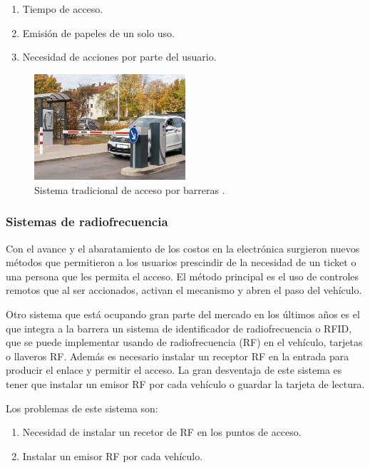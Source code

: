\begin{enumerate}
    \item Tiempo de acceso.
    \item Emisión de papeles de un solo uso.
    \item Necesidad de acciones por parte del usuario.
\end{enumerate}

\begin{figure}[bth]
    \centering
    \includegraphics[width=0.5\textwidth]{imgs/sistema-control-acceso-barreras.jpg}
    \caption{Sistema tradicional de acceso por barreras \cite{integralia_sistema_2019}.}
    \label{fig:sistema-tradicional}
\end{figure}

\subsubsection{Sistemas de radiofrecuencia}

Con el avance y el abaratamiento de los costos en la electrónica surgieron nuevos métodos que permitieron a los usuarios prescindir de la necesidad de un ticket o una persona que les permita el acceso. El método principal es el uso de controles remotos que al ser accionados, activan el mecanismo y abren el paso del vehículo.

Otro sistema que está ocupando gran parte del mercado en los últimos años es el que integra a la barrera un sistema de identificador de radiofrecuencia o RFID, que se puede implementar usando de radiofrecuencia (RF) en el vehículo, tarjetas o llaveros RF. Además es necesario instalar un receptor RF en la entrada para producir el enlace y permitir el acceso.
La gran desventaja de este sistema es tener que instalar un emisor RF por cada vehículo o guardar la tarjeta de lectura.

Los problemas de este sistema son:

\begin{enumerate}
    \item Necesidad de instalar un recetor de RF en los puntos de acceso.
    \item Instalar un emisor RF por cada vehículo.
\end{enumerate}

